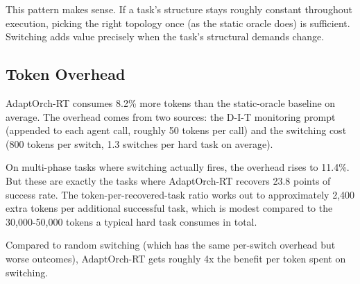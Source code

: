This pattern makes sense. If a task's structure stays roughly constant
throughout execution, picking the right topology once (as the static
oracle does) is sufficient. Switching adds value precisely when the
task's structural demands change.

\subsection{Token Overhead}\label{token-overhead}

AdaptOrch-RT consumes 8.2\% more tokens than the static-oracle baseline
on average. The overhead comes from two sources: the D-I-T monitoring
prompt (appended to each agent call, roughly 50 tokens per call) and the
switching cost (800 tokens per switch, 1.3 switches per hard task on
average).

On multi-phase tasks where switching actually fires, the overhead rises
to 11.4\%. But these are exactly the tasks where AdaptOrch-RT recovers
23.8 points of success rate. The token-per-recovered-task ratio works
out to approximately 2,400 extra tokens per additional successful task,
which is modest compared to the 30,000-50,000 tokens a typical hard task
consumes in total.

Compared to random switching (which has the same per-switch overhead but
worse outcomes), AdaptOrch-RT gets roughly 4x the benefit per token
spent on switching.
